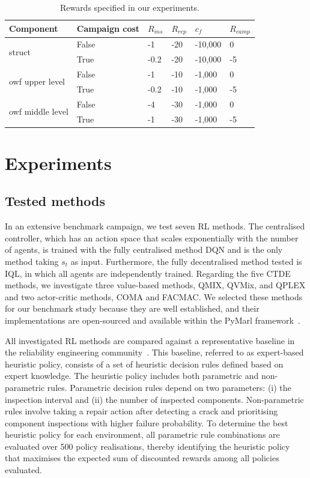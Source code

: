 \begin{table}
\centering
\caption{Rewards specified in our experiments.}
\label{tab:rewards_det}
\begin{tabular}{llllll}
\toprule
Component & Campaign cost & $R_{ins}$ & $R_{rep}$ &  $c_f$ & $R_{camp}$ \\
\bottomrule
\multirow{2}{*}{struct} &  False & -1 & -20 & -10,000 & 0  \\ 
& True & -0.2 & -20 & -10,000 & -5   \\
\bottomrule
\multirow{2}{*}{owf upper level} & False & -1 & -10 & -1,000 & 0     \\
& True  & -0.2 & -10 & -1,000 & -5     \\
\multirow{2}{*}{owf middle level} & False & -4 & -30 & -1,000 & 0    \\
& True & -1 & -30 & -1,000 & -5    \\
\bottomrule
\end{tabular}
\end{table}


\section{Experiments}\label{sec:ch5_experiments}
\subsection{Tested methods}
\label{sec:tested_method}
In an extensive benchmark campaign, we test seven RL methods.
The centralised controller, which has an action space that scales exponentially with the number of agents, is trained with the fully centralised method DQN and is the only method taking $s_t$ as input.
Furthermore, the fully decentralised method tested is IQL, in which all agents are independently trained.
Regarding the five CTDE methods, we investigate three value-based methods, QMIX, QVMix, and QPLEX and two actor-critic methods, COMA and FACMAC.
We selected these methods for our benchmark study because they are well established, and their implementations are open-sourced and available within the PyMarl framework~\citep{samvelyan2019starcraft}.

All investigated RL methods are compared against a representative baseline in the reliability engineering community~\citep{LuqueDBN2019,morato2022syst}.
This baseline, referred to as expert-based heuristic policy, consists of a set of heuristic decision rules defined based on expert knowledge.
The heuristic policy includes both parametric and non-parametric rules.
Parametric decision rules depend on two parameters: (i) the inspection interval and (ii) the number of inspected components.
Non-parametric rules involve taking a repair action after detecting a crack and prioritising component inspections with higher failure probability.
To determine the best heuristic policy for each environment, all parametric rule combinations are evaluated over 500 policy realisations, thereby identifying the heuristic policy that maximises the expected sum of discounted rewards among all policies evaluated.

